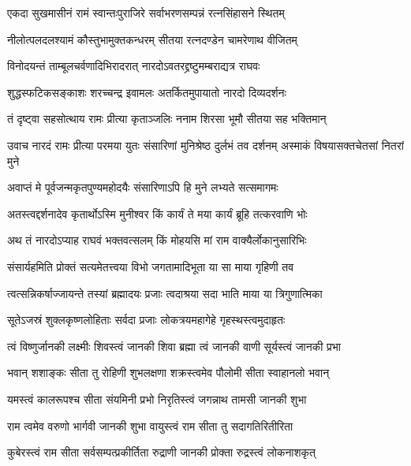 


\twolineshloka
{एकदा सुखमासीनं रामं स्वान्तःपुराजिरे}
{सर्वाभरणसम्पन्नं रत्नसिंहासने स्थितम्} %

\twolineshloka
{नीलोत्पलदलश्यामं कौस्तुभामुक्तकन्धरम्}
{सीतया रत्नदण्डेन चामरेणाथ वीजितम्} %

\twolineshloka
{विनोदयन्तं ताम्बूलचर्वणादिभिरादरात्}
{नारदोऽवतरद्द्रष्टुमम्बराद्यत्र राघवः} %

\twolineshloka
{शुद्धस्फटिकसङ्काशः शरच्चन्द्र इवामलः}
{अतर्कितमुपायातो नारदो दिव्यदर्शनः} %

\twolineshloka
{तं दृष्ट्वा सहसोत्थाय रामः प्रीत्या कृताञ्जलिः}
{ननाम शिरसा भूमौ सीतया सह भक्तिमान्} %

\threelineshloka
{उवाच नारदं रामः प्रीत्या परमया युतः}
{संसारिणां मुनिश्रेष्ठ दुर्लभं तव दर्शनम्}
{अस्माकं विषयासक्तचेतसां नितरां मुने} %

\twolineshloka
{अवाप्तं मे पूर्वजन्मकृतपुण्यमहोदयैः}
{संसारिणाऽपि हि मुने लभ्यते सत्समागमः} %

\twolineshloka
{अतस्त्वद्दर्शनादेव कृतार्थोऽस्मि मुनीश्वर}
{किं कार्यं ते मया कार्यं ब्रूहि तत्करवाणि भोः} %

\twolineshloka
{अथ तं नारदोऽप्याह राघवं भक्तवत्सलम्}
{किं मोहयसि मां राम वाक्यैर्लोकानुसारिभिः} %

\twolineshloka
{संसार्यहमिति प्रोक्तं सत्यमेतत्त्वया विभो}
{जगतामादिभूता या सा माया गृहिणी तव} %

\twolineshloka
{त्वत्सन्निकर्षाज्जायन्ते तस्यां ब्रह्मादयः प्रजाः}
{त्वदाश्रया सदा भाति माया या त्रिगुणात्मिका} %

\twolineshloka
{सूतेऽजस्रं शुक्लकृष्णलोहिताः सर्वदा प्रजाः}
{लोकत्रयमहागेहे गृहस्थस्त्वमुदाहृतः} %

\twolineshloka
{त्वं विष्णुर्जानकी लक्ष्मीः शिवस्त्वं जानकी शिवा}
{ब्रह्मा त्वं जानकी वाणी सूर्यस्त्वं जानकी प्रभा} %

\twolineshloka
{भवान् शशाङ्कः सीता तु रोहिणी शुभलक्षणा}
{शक्रस्त्वमेव पौलोमी सीता स्वाहानलो भवान्} %

\twolineshloka
{यमस्त्वं कालरूपश्च सीता संयमिनी प्रभो}
{निरृतिस्त्वं जगन्नाथ तामसी जानकी शुभा} %

\twolineshloka
{राम त्वमेव वरुणो भार्गवी जानकी शुभा}
{वायुस्त्वं राम सीता तु सदागतिरितीरिता} %

\twolineshloka
{कुबेरस्त्वं राम सीता सर्वसम्पत्प्रकीर्तिता}
{रुद्राणी जानकी प्रोक्ता रुद्रस्त्वं लोकनाशकृत्} %

